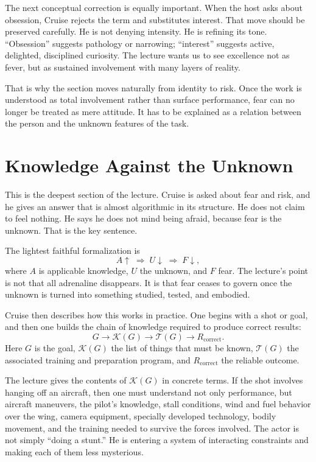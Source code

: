 The next conceptual correction is equally important. When the host asks about obsession, Cruise rejects the term and substitutes interest. That move should be preserved carefully. He is not denying intensity. He is refining its tone. ``Obsession'' suggests pathology or narrowing; ``interest'' suggests active, delighted, disciplined curiosity. The lecture wants us to see excellence not as fever, but as sustained involvement with many layers of reality.

That is why the section moves naturally from identity to risk. Once the work is understood as total involvement rather than surface performance, fear can no longer be treated as mere attitude. It has to be explained as a relation between the person and the unknown features of the task.

\section{Knowledge Against the Unknown}

This is the deepest section of the lecture. Cruise is asked about fear and risk, and he gives an answer that is almost algorithmic in its structure. He does not claim to feel nothing. He says he does not mind being afraid, because fear is the unknown. That is the key sentence.

The lightest faithful formalization is
\begin{equation}
A\uparrow \;\Longrightarrow\; U\downarrow \;\Longrightarrow\; F\downarrow,
\end{equation}
where \(A\) is applicable knowledge, \(U\) the unknown, and \(F\) fear. The lecture's point is not that all adrenaline disappears. It is that fear ceases to govern once the unknown is turned into something studied, tested, and embodied.

Cruise then describes how this works in practice. One begins with a shot or goal, and then one builds the chain of knowledge required to produce correct results:
\begin{equation}
G \longrightarrow \mathcal{K}(G) \longrightarrow \mathcal{T}(G) \longrightarrow R_{\mathrm{correct}}.
\end{equation}
Here \(G\) is the goal, \(\mathcal{K}(G)\) the list of things that must be known, \(\mathcal{T}(G)\) the associated training and preparation program, and \(R_{\mathrm{correct}}\) the reliable outcome.

The lecture gives the contents of \(\mathcal{K}(G)\) in concrete terms. If the shot involves hanging off an aircraft, then one must understand not only performance, but aircraft maneuvers, the pilot's knowledge, stall conditions, wind and fuel behavior over the wing, camera equipment, specially developed technology, bodily movement, and the training needed to survive the forces involved. The actor is not simply ``doing a stunt.'' He is entering a system of interacting constraints and making each of them less mysterious.

